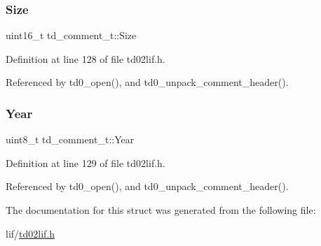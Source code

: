 \subsubsection{\texorpdfstring{Size}{Size}}
{\footnotesize\ttfamily uint16\+\_\+t td\+\_\+comment\+\_\+t\+::\+Size}



Definition at line 128 of file td02lif.\+h.



Referenced by td0\+\_\+open(), and td0\+\_\+unpack\+\_\+comment\+\_\+header().

\mbox{\label{structtd__comment__t_a0c804ec07303f411dd508dc64900aff5}} 
\subsubsection{\texorpdfstring{Year}{Year}}
{\footnotesize\ttfamily uint8\+\_\+t td\+\_\+comment\+\_\+t\+::\+Year}



Definition at line 129 of file td02lif.\+h.



Referenced by td0\+\_\+open(), and td0\+\_\+unpack\+\_\+comment\+\_\+header().



The documentation for this struct was generated from the following file\+:\begin{DoxyCompactItemize}
\item 
lif/\hyperlink{td02lif_8h}{td02lif.\+h}\end{DoxyCompactItemize}
